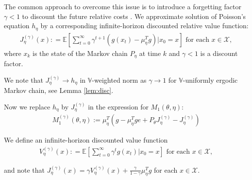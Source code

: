 \documentclass[11pt]{article}
\newcommand{\E}{\mathbb{E}}
\newcommand{\X}{\mathcal{X}}
\newcommand{\V}{\mathbb{V}}
\theoremstyle{definition}
\numberwithin{equation}{section}
\begin{document}
The common approach to overcome this issue  is to introduce a forgetting   factor $\gamma<1$
 to discount the future relative costs  \cite{Jaakkola1994, Baxter2001, Marbach2001, Kakade2001, Thomas2014, Schulman2016}. %
We approximate solution of Poisson's equation $h_{\eta}$ by a corresponding infinite-horizon discounted relative value function:
\begin{align*}
J_{\eta}^{(\gamma)}(x): = \E \left[ \sum\limits_{t=0}^\infty \gamma^{t+1}  (g(x_t) - \mu^T_\eta g ) \Big| x_0 = x\right] \text{ for each }x\in \X,
\end{align*}
 where  $x_k$ is the state of the Markov chain $P_\eta$ at time $k$ and  $\gamma<1$ is a discount factor.

We note that $J^{(\gamma)}_{\eta} \rightarrow h_\eta$  in $\V$-weighted norm as $\gamma\rightarrow 1$  for $\V$-uniformly ergodic Markov chain, see Lemma \ref{lem:disc}.

 


Now we replace $h_\eta$ by $J^{(\gamma)}_{\eta}$ in the expression for $M_1(\theta, \eta)$:
\begin{align*}
M^{(\gamma)}_1(\theta, \eta):=\mu_{\eta}^T( g - \mu_\eta^T g e + P_{\theta}  J^{(\gamma)}_{\eta} - J^{(\gamma)}_{\eta}  )
\end{align*}

We define an infinite-horizon discounted   value function 
\begin{align*}
V^{(\gamma)}_{\eta}(x): = \E \left[ \sum\limits_{t=0}^\infty \gamma^{t }  g(x_t)  \Big| x_0 = x\right] \text{ for each }x\in \X,
\end{align*}

and note that $J^{(\gamma)}_{\eta}(x) = \gamma V^{(\gamma)}_{\eta}(x) + \frac{\gamma}{1-\gamma}\mu^T_\eta g$ for each $x\in \X.$
\end{document}

